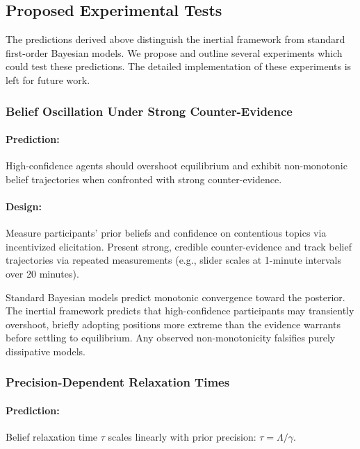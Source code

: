 \documentclass[12pt]{article}
\begin{document}
\subsection{Proposed Experimental Tests}

The predictions derived above distinguish the inertial framework from standard first-order Bayesian models. We propose and outline several experiments which could test these predictions. The detailed implementation of these experiments is left for future work.

\subsubsection{Belief Oscillation Under Strong Counter-Evidence}

\paragraph{Prediction:} High-confidence agents should overshoot equilibrium and exhibit non-monotonic belief trajectories when confronted with strong counter-evidence.

\paragraph{Design:} Measure participants' prior beliefs and confidence on contentious topics via incentivized elicitation. Present strong, credible counter-evidence and track belief trajectories via repeated measurements (e.g., slider scales at 1-minute intervals over 20 minutes). 

Standard Bayesian models predict monotonic convergence toward the posterior. The inertial framework predicts that high-confidence participants may transiently overshoot, briefly adopting positions more extreme than the evidence warrants before settling to equilibrium. Any observed non-monotonicity falsifies purely dissipative models.

\subsubsection{Precision-Dependent Relaxation Times}

\paragraph{Prediction:} Belief relaxation time $\tau$ scales linearly with prior precision: $\tau = \Lambda/\gamma$.
\end{document}
